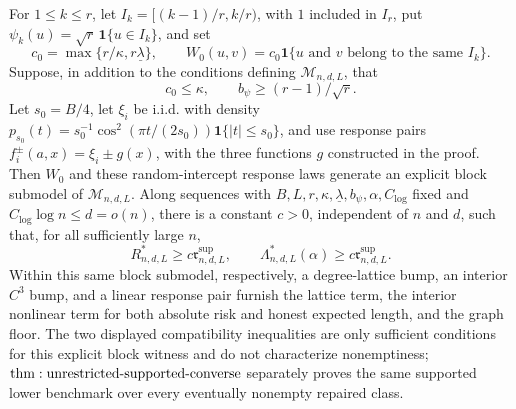 For \(1\leq k\leq r\), let \(I_k=[(k-1)/r,k/r)\), with \(1\) included in \(I_r\), put \(\psi_k(u)=\sqrt r\,\mathbf 1\{u\in I_k\}\), and set
\[
 c_0=\max\{r/\kappa,r\underline\lambda\},
 \qquad
 W_0(u,v)=c_0\mathbf 1\{u\text{ and }v\text{ belong to the same }I_k\}.
\]
Suppose, in addition to the conditions defining \(\mathcal M_{n,d,L}\), that
\[
 c_0\leq\kappa,
 \qquad
 b_\psi\geq (r-1)/\sqrt r.
\]
Let \(s_0=B/4\), let \(\xi_i\) be i.i.d. with density \(p_{s_0}(t)=s_0^{-1}\cos^2(\pi t/(2s_0))\mathbf 1\{|t|\leq s_0\}\), and use response pairs \(f_i^\pm(a,x)=\xi_i\pm g(x)\), with the three functions \(g\) constructed in the proof.  Then \(W_0\) and these random-intercept response laws generate an explicit block submodel of \(\mathcal M_{n,d,L}\).  Along sequences with \(B,L,r,\kappa,\underline\lambda,b_\psi,\alpha,C_{\log}\) fixed and \(C_{\log}\log n\leq d=o(n)\), there is a constant \(c>0\), independent of \(n\) and \(d\), such that, for all sufficiently large \(n\),
\[
 R^*_{n,d,L}\geq c\mathfrak r^{\mathrm{sup}}_{n,d,L},
 \qquad
 \Lambda^*_{n,d,L}(\alpha)\geq c\mathfrak r^{\mathrm{sup}}_{n,d,L}.
\]
Within this same block submodel, respectively, a degree-lattice bump, an interior \(C^3\) bump, and a linear response pair furnish the lattice term, the interior nonlinear term for both absolute risk and honest expected length, and the graph floor.  The two displayed compatibility inequalities are only sufficient conditions for this explicit block witness and do not characterize nonemptiness; \({\rm thm:unrestricted\text{-}supported\text{-}converse}\) separately proves the same supported lower benchmark over every eventually nonempty repaired class.